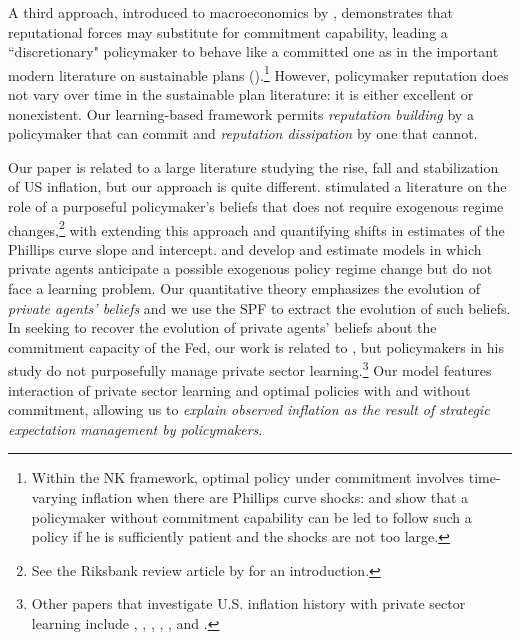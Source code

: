 \documentclass[12pt,letter,leqno]{article}
\theoremstyle{asn}
\theoremstyle{lem}
\theoremstyle{slem}
\theoremstyle{prop}
\theoremstyle{appprop}
\theoremstyle{rem}
\theoremstyle{defn}
\begin{document}
 
A third approach, introduced to macroeconomics by \cite{barro_rules_1983}, demonstrates that reputational forces may substitute for commitment capability, leading a ``discretionary" policymaker to behave like a committed one as in the important modern literature on sustainable plans (\cite{chari_sustainable_1990}).\footnote{Within the NK framework, optimal policy under commitment involves time-varying inflation when there are Phillips curve shocks:  \cite{KUROZUMI20081277} and \cite{LOISEL20083718} show that a policymaker without commitment capability can be led to follow such a policy if he is sufficiently patient and the shocks are not too large.} However, policymaker reputation does not vary over time in the sustainable plan literature: it is either excellent or nonexistent. Our learning-based framework permits \textit{reputation building} by a policymaker that can commit and \textit{reputation dissipation} by one that cannot.



Our paper is related to a large literature studying the rise, fall and stabilization of US inflation, but our approach is quite different. 
\cite{sargent_conquest_1999} stimulated a literature on the role of a purposeful policymaker's beliefs that does not require exogenous regime changes,\footnote{See the Riksbank review article by \cite{sargent_conquest_2000} for an introduction.} with \cite{Primiceri2006} extending this approach and quantifying shifts in estimates of the Phillips curve slope and intercept.
\cite{Bianchi2013} and \cite{Debortoli2016} develop and estimate models in which private agents anticipate a possible exogenous policy regime change but do not face a learning problem. Our quantitative theory emphasizes the evolution of \textit{private agents' beliefs} and we use the SPF to extract the evolution of such beliefs. In seeking to recover the evolution of private agents' beliefs about the commitment capacity of the Fed, our work is related to \cite{matthes_figuring_2015}, but policymakers in his study do not purposefully manage private sector learning.\footnote{\label{fn:learning}Other papers that investigate U.S. inflation history with private sector learning include \cite{ball_disinflation}, \cite{erceg_imperfect_2003}, \cite{ORPHANIDES20051927}, \cite{goodfriend_incredible_2005}, \cite{Cogley2015}, and \cite{Melosi2016}.} Our model features interaction of private sector learning and optimal policies with and without commitment, allowing us to \textit{explain observed inflation as the result of strategic expectation management by policymakers}.
\end{document}
